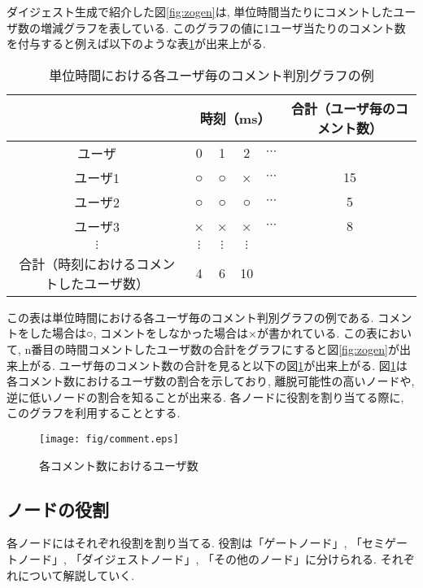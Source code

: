 ダイジェスト生成で紹介した図\ref{fig:zogen}は, 単位時間当たりにコメントしたユーザ数の増減グラフを表している. このグラフの値に1ユーザ当たりのコメント数を付与すると例えば以下のような表\ref{tbl:user-comment}が出来上がる.

\begin{table}[h]
  \caption{単位時間における各ユーザ毎のコメント判別グラフの例}
  \label{tbl:user-comment}
  \centering
      {\small
        \begin{tabular}{|c||c|c|c|c|c|} \hline
          & \multicolumn{4}{|c|}{時刻（ms）} & 合計（ユーザ毎のコメント数） \\ \hline \hline
          ユーザ & 0 & 1 & 2 & $\cdots$ & \\ \hline \hline
          ユーザ1 & ○ & ○ & × & $\cdots$ & 15 \\ \hline
          ユーザ2 & ○ & ○ & ○ & $\cdots$ & 5 \\ \hline
          ユーザ3 & × & × & × & $\cdots$ & 8 \\ \hline
          $\vdots$ & $\vdots$ & $\vdots$ & $\vdots$ & &  \\ \hline
          合計（時刻におけるコメントしたユーザ数） & 4 & 6 & 10 & &  \\ \hline
        \end{tabular}
      }
\end{table}

この表は単位時間における各ユーザ毎のコメント判別グラフの例である. コメントをした場合は○, コメントをしなかった場合は×が書かれている. この表において, n番目の時間コメントしたユーザ数の合計をグラフにすると図\ref{fig:zogen}が出来上がる. ユーザ毎のコメント数の合計を見ると以下の図\ref{fig:comment}が出来上がる. 図\ref{fig:comment}は各コメント数におけるユーザ数の割合を示しており, 離脱可能性の高いノードや, 逆に低いノードの割合を知ることが出来る. 各ノードに役割を割り当てる際に, このグラフを利用することとする.

\begin{figure}[h]
  \centering
  \texttt{[image: fig/comment.eps]}
  \caption{各コメント数におけるユーザ数}
  \label{fig:comment}
\end{figure}

\newpage

\subsection{ノードの役割}
各ノードにはそれぞれ役割を割り当てる. 役割は「ゲートノード」, 「セミゲートノード」, 「ダイジェストノード」, 「その他のノード」に分けられる. それぞれについて解説していく.

